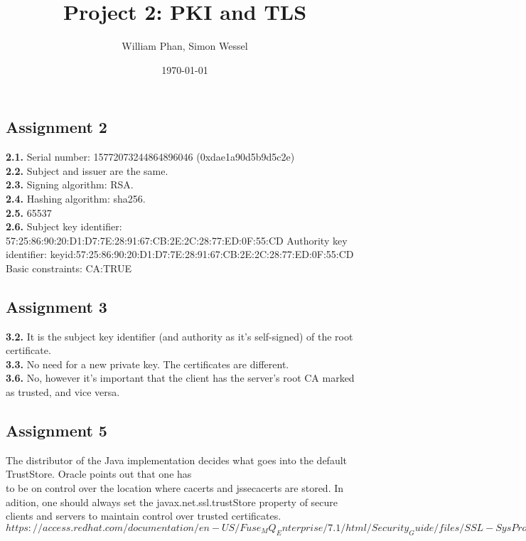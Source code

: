 \documentclass[11pt,a4paper]{article}
\title{Project 2: PKI and TLS} %
\author{William Phan, Simon Wessel}
\date{\today} %
\begin{document}
\maketitle %

\setcounter{secnumdepth}{0}

\subsection{Assignment 2}
\textbf{2.1.} Serial number: 15772073244864896046 (0xdae1a90d5b9d5c2e)\\
\textbf{2.2.} Subject and issuer are the same.\\
\textbf{2.3.} Signing algorithm: RSA.\\
\textbf{2.4.} Hashing algorithm: sha256.\\
\textbf{2.5.} 65537\\
\textbf{2.6.} Subject key identifier:
     57:25:86:90:20:D1:D7:7E:28:91:67:CB:2E:2C:28:77:ED:0F:55:CD\newline
     \indent Authority key identifier:
     keyid:57:25:86:90:20:D1:D7:7E:28:91:67:CB:2E:2C:28:77:ED:0F:55:CD\\
     Basic constraints:
     CA:TRUE
     
\subsection{Assignment 3}
\textbf{3.2.} It is the subject key identifier (and authority as it's self-signed) of the root certificate.\\
\textbf{3.3.} No need for a new private key. The certificates are different.\\
\textbf{3.6.} No, however it's important that the client has the server's root CA marked as trusted, and vice versa.

\subsection{Assignment 5}
The distributor of the Java implementation decides what goes into the default TrustStore. Oracle points out that one has \\to be on control over the location where cacerts and jssecacerts are stored. In adition, one should always set the javax.net.ssl.trustStore property of secure clients and servers to maintain control over trusted certificates.
$https://access.redhat.com/documentation/en-US/Fuse_MQ_Enterprise/7.1/html/Security_Guide/files/SSL-SysProps.html$
\end{document}
